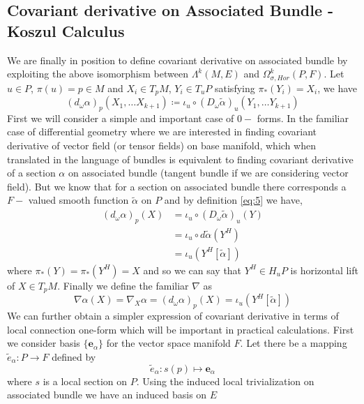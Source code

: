 \documentclass[12pt]{article}
\begin{document}
\subsection{Covariant derivative on Associated Bundle - Koszul Calculus}
We are finally in position to define covariant derivative on associated bundle by exploiting the above isomorphism between $\Lambda^{k}(M, E)$ and $\Omega^{k}_{\sigma, Hor}(P, F)$. Let $u\in P$, $\pi(u)= p\in M$ and $X_{i}\in T_{p}M$, $Y_{i}\in T_{u}P$ satisfying $\pi_{\ast}(Y_{i}) = X_{i}$, we have
\begin{equation}\label{eq:5}
    (d_{\omega}\alpha)_{p}(X_{1}, \dots X_{k+1}) \coloneqq \iota_{u}\circ(D_{\omega}\tilde{\alpha})_{u}(Y_{1}, \dots Y_{k+1})
\end{equation}
First we will consider a simple and important case of $0-$ forms. In the familiar case of differential geometry where we are interested in finding covariant derivative of vector field (or tensor fields) on base manifold, which when translated in the language of bundles is equivalent to finding covariant derivative of a section $\alpha$ on associated bundle (tangent bundle if we are considering vector field). But we know that for a section on associated bundle there corresponds a $F-$ valued smooth function $\tilde{\alpha}$ on $P$ and by definition \ref{eq:5} we have,
\begin{align*}
    (d_{\omega}\alpha)_{p}(X) &= \iota_{u}\circ(D_{\omega}\tilde{\alpha})_{u}(Y) \\
                              &= \iota_{u}\circ d\tilde{\alpha}(Y^{H}) \\
                              &= \iota_{u}(Y^{H}[\tilde{\alpha}])
\end{align*} where $\pi_{\ast}(Y) = \pi_{\ast}(Y^{H}) = X $ and so we can say that $Y^{H}\in H_{u}P$ is horizontal lift of $X\in T_{p}M $. Finally we define the familiar $\nabla$ as
\begin{equation*}
    \nabla\alpha(X) = \nabla_{X}\alpha = (d_{\omega}\alpha)_{p}(X) = \iota_{u}(Y^{H}[\tilde{\alpha}])
\end{equation*}
We can further obtain a simpler expression of covariant derivative in terms of local connection one-form which will be important in practical calculations. First we consider basis $\{\mathbf{e}_{\alpha}\}$ for the vector space manifold $F$. Let there be a mapping $\tilde{e}_{\alpha}\colon P\to F$ defined by
\begin{equation*}
    \tilde{e}_{\alpha}\colon s(p)\mapsto \mathbf{e}_{\alpha}
\end{equation*} where $s$ is a local section on $P$. Using the induced local trivialization on associated bundle we have an induced basis on $E$
\end{document}
